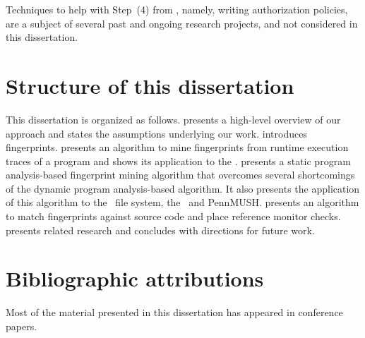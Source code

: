 Techniques to help with Step~(4) from
, namely, writing authorization
policies, are a subject of several past and ongoing research projects, and not 
considered in this dissertation. 


\section{Structure of this dissertation} 
\label{chapter:introduction:structure}
%
This dissertation is organized as follows.   presents
a high-level overview of our approach and states the assumptions underlying our
work.   introduces fingerprints.
 presents an algorithm to mine fingerprints from
runtime execution traces of a program and shows its application to the
\xserver.   presents a static program analysis-based
fingerprint mining algorithm that overcomes several shortcomings of the dynamic
program analysis-based algorithm. It also presents the application of this
algorithm to the \ext\ file system, the \xserver\ and PennMUSH.
 presents an algorithm to match fingerprints against
source code and place reference monitor checks.  
presents related research and  concludes with
directions for future work.
%

\section{Bibliographic attributions}
\label{chapter:introduction:biblio}

Most of the material presented in this dissertation has appeared in conference
papers.


